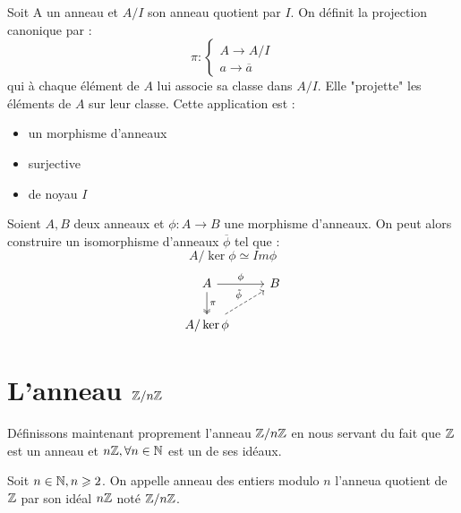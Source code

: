 \begin{definition}
    Soit A un anneau et $A/I$ son anneau quotient par $I$. 
    On définit la projection canonique par : 
        \[ \pi : 
            \begin{cases}
                A \longrightarrow A/I \\ 
                a \longrightarrow \overline{a} 
            \end{cases} \]
    qui à chaque élément de $A$ lui associe sa classe dans $A/I$. Elle "projette" les éléments de $A$ sur leur classe. 
    Cette application est : 
    \begin{itemize}
        \item un morphisme d'anneaux 
        \item surjective 
        \item de noyau $I$ 
    \end{itemize}
\end{definition}

\newpage 

\begin{theorem}[Isomorphisme]
    Soient $A,B$ deux anneaux et $\phi : A \longrightarrow B$ une morphisme d'anneaux. 
    On peut alors construire un isomorphisme d'anneaux $\overline{\phi}$ tel que : 
        \[ A / \ker \phi \simeq Im \phi \] 
    \[
        \begin{tikzcd}
            A \arrow[r, "\phi"] \arrow[d, two heads, "\pi"] & B \\
            A/\ker \phi \arrow[ur, "\tilde{\phi}", dashed] & 
        \end{tikzcd}
    \]
\end{theorem}



\section{L'anneau $\Z / n\Z$}

Définissons maintenant proprement l'anneau $\Z /n \Z$ en nous servant du fait que $\mathbb{Z}$ est un anneau 
et $ n \mathbb{Z}, \forall n \in \mathbb{N}$ est un de ses idéaux. 

\begin{definition}[Anneau $\Z / n \Z$]
    Soit $n \in \mathbb{N}, n \geqslant 2$. On appelle anneau des entiers modulo $n$ l'anneua quotient de $\mathbb{Z}$ 
    par son idéal $n\mathbb{Z}$ noté $\Z /n \Z$. 
\end{definition}

